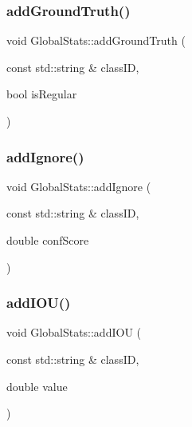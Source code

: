 \subsubsection{\texorpdfstring{add\+Ground\+Truth()}{addGroundTruth()}}
{\footnotesize\ttfamily void Global\+Stats\+::add\+Ground\+Truth (\begin{DoxyParamCaption}\item[{const std\+::string \&}]{class\+ID,  }\item[{bool}]{is\+Regular }\end{DoxyParamCaption})}

\mbox{\label{class_global_stats_a44ef2427549b0eb26c755b0a2e9a5ae9}} 
\subsubsection{\texorpdfstring{add\+Ignore()}{addIgnore()}}
{\footnotesize\ttfamily void Global\+Stats\+::add\+Ignore (\begin{DoxyParamCaption}\item[{const std\+::string \&}]{class\+ID,  }\item[{double}]{conf\+Score }\end{DoxyParamCaption})}

\mbox{\label{class_global_stats_a07078ad8a5909da138bb7d0571f461c3}} 
\subsubsection{\texorpdfstring{add\+I\+O\+U()}{addIOU()}}
{\footnotesize\ttfamily void Global\+Stats\+::add\+I\+OU (\begin{DoxyParamCaption}\item[{const std\+::string \&}]{class\+ID,  }\item[{double}]{value }\end{DoxyParamCaption})}

\mbox{\label{class_global_stats_a43e9e950d3ab11dd07f7fe3ca76f91ee}} 
